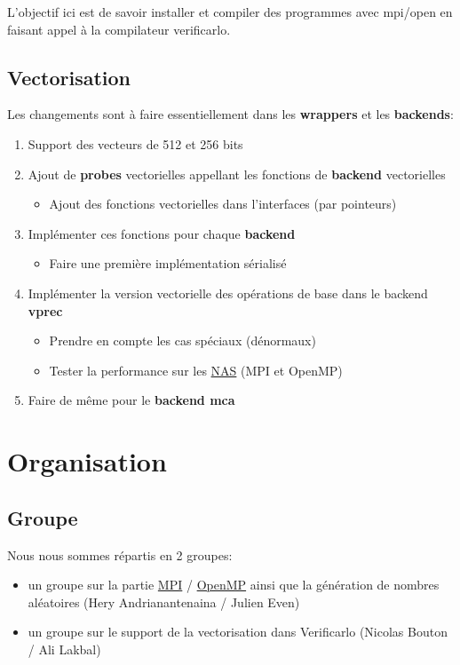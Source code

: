 \documentclass[11pt]{article}
\begin{document}
L'objectif ici est de savoir installer et compiler des programmes avec
mpi/open en faisant appel à la compilateur verificarlo.

\subsection{Vectorisation}
\label{sec:org1382281}

Les changements sont à faire essentiellement dans les \textbf{wrappers} et
les \textbf{backends}:

\begin{enumerate}
\item Support des vecteurs de 512 et 256 bits
\item Ajout de \textbf{probes} vectorielles appellant les fonctions de
\textbf{backend} vectorielles
\begin{itemize}
\item Ajout des fonctions vectorielles dans l'interfaces (par
pointeurs)
\end{itemize}
\item Implémenter ces fonctions pour chaque \textbf{backend}
\begin{itemize}
\item Faire une première implémentation sérialisé
\end{itemize}
\item Implémenter la version vectorielle des opérations de base dans
le backend \textbf{vprec}
\begin{itemize}
\item Prendre en compte les cas spéciaux (dénormaux)
\item Tester la performance sur les \href{https://www.nas.nasa.gov/publications/npb.html}{NAS} (MPI et OpenMP)
\end{itemize}
\item Faire de même pour le \textbf{backend mca}
\end{enumerate}

\section{Organisation}
\label{sec:orgc8d05dc}
\subsection{Groupe}
\label{sec:orgf02940d}

Nous nous sommes répartis en 2 groupes:
\begin{itemize}
\item un groupe sur la partie \href{https://www.mpich.org/}{MPI} / \href{https://www.openmp.org/}{OpenMP} ainsi que la génération de
nombres aléatoires (Hery Andrianantenaina / Julien Even)
\item un groupe sur le support de la vectorisation dans Verificarlo
(Nicolas Bouton / Ali Lakbal)
\end{itemize}
\end{document}
